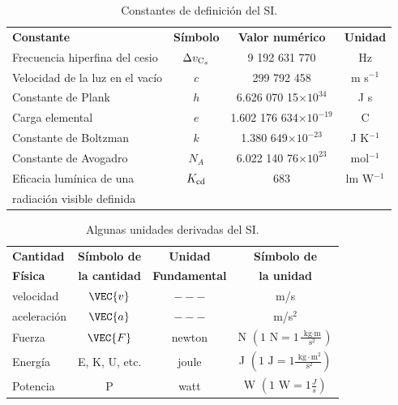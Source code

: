 \begin{table}[h!]
\caption{Constantes de definici\'on del SI.}
\label{tab:SI-const}
\begin{center}
\begin{tabular}{lccc}
\toprule
\textbf{Constante}&\textbf{S\'imbolo}&\textbf{Valor num\'erico}&\textbf{Unidad}\\[.5cm]
\otoprule 
Frecuencia hiperfina del cesio & $\Delta v_{\mbox{\scriptsize{C}}_s}$& 9 192 631 770& Hz\\[.5cm]
Velocidad de la luz en el vac\'io & $c$& 299 792 458& m s$^{-1}$\\[.5cm]
Constante de Plank & $h$& 6.626 070 15$\times 10^{34}$& J s\\[.5cm]
Carga elemental& $e$& 1.602 176 634$\times 10^{-19}$& C\\[.5cm]
Constante de Boltzman& $k$& 1.380 649$\times 10^{-23}$& J K$^{-1}$\\[.5cm]
Constante de Avogadro& $N_A$& 6.022 140 76$\times 10^{23}$& mol$^{-1}$\\[.5cm]
Eficacia lum\'inica de una  & $K_{\mbox{\scriptsize{cd}}}$&683&lm W$^{-1}$\\[.5cm]
\hspace{3ex}radiaci\'on visible definida & & & \\[.5cm]
\bottomrule
\end{tabular}
\end{center}
\end{table}



\begin{table}[h!]
\caption{Algunas unidades derivadas del SI.}
\label{tab:SI-der}
\begin{center}
\begin{tabular}{lccc}
\toprule
\textbf{Cantidad}&\textbf{S\'imbolo de}&\textbf{Unidad}&\textbf{S\'imbolo de}\\[.5cm]
\textbf{F\'isica}&\textbf{la cantidad}&\textbf{Fundamental}&\textbf{la unidad}\\[.5cm]
\otoprule 
velocidad & $\VEC{v}$& $---$ & m/s\\[.5cm]
aceleraci\'on & $\VEC{a}$& $---$ & m/s$^{2}$\\[.5cm]
Fuerza & $\VEC{F}$& newton & N $\left(1 \text{ N}=1\frac{\text{ kg}\cdot \mbox{m}}{\text{ s}^{2}}\right)$\\[.5cm]
Energ\'ia & E, K, U, etc. & joule & J $\left(1 \text{ J}=1\frac{\text{ kg}\cdot \mbox{m}^{2}}{\text{ s}^{2}}\right)$\\[.5cm]
Potencia & P & watt & W $\left(1 \text{ W}=1\frac{J}{s}\right)$\\[.5cm]
\bottomrule
\end{tabular}
\end{center}
\end{table}



